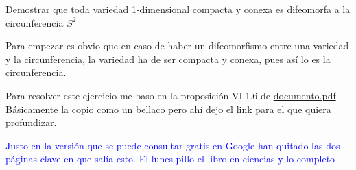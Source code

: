 \begin{problem}[5]
Demostrar que toda variedad 1-dimensional compacta y conexa es difeomorfa a la circunferencia $S^2$
\solution


Para empezar es obvio que en caso de haber un difeomorfismo entre una variedad y la circunferencia, la variedad ha de ser compacta y conexa, pues así lo es la circunferencia.

Para resolver este ejercicio me baso en la proposición VI.1.6 de \href{https://books.google.es/books?id=CAOjRFAMJFUC&pg=PA131&lpg=PA131&dq=variedad+1-dimensional&source=bl&ots=MLkMP7HMyo&sig=aLLSSaYknqPZhPsn-5jJM2MwPAc&hl=es&sa=X&ei=DeMeVZSOEczZPdLkgfgJ&ved=0CCcQ6AEwAQ#v=onepage&q&f=false}{documento.pdf}. Básicamente la copio como un bellaco pero ahí dejo el link para el que quiera profundizar.

\textcolor{blue}{Justo en la versión que se puede consultar gratis en Google han quitado las dos páginas clave en que salía esto. El lunes pillo el libro en ciencias y lo completo}

\end{problem}

